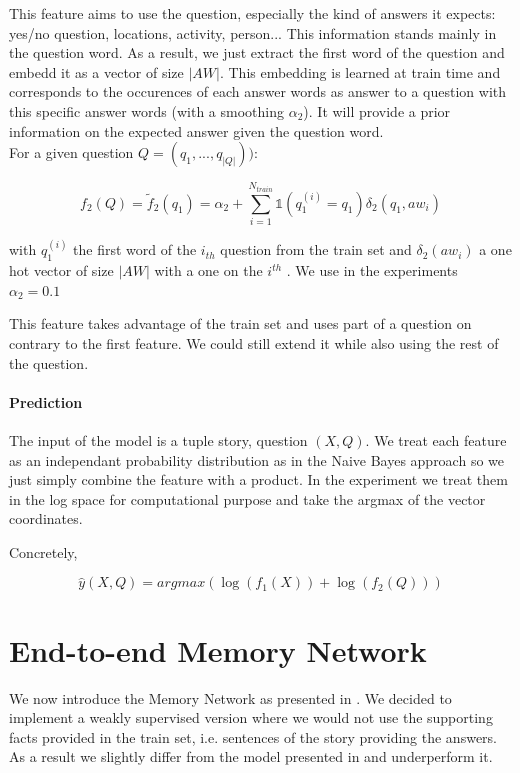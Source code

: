 \documentclass[twoside,11pt]{article}
\begin{document}
This feature aims to use the question, especially the kind of answers it expects: yes/no question, locations, activity, person... This information stands mainly in the question word. As a result, we just extract the first word of the question and embedd it as a vector of size $|AW|$. This embedding is learned at train time and corresponds to the occurences of each answer words as answer to a question with this specific answer words (with a smoothing $\alpha_2$). It will provide a prior information on the expected answer given the question word.\\

\noindent For a given question $Q = (q_1, ..., q_{|Q|}))$:

\[
f_2(Q) = \tilde{f}_2(q_1) = \alpha_2 + \sum_{i = 1}^{N_{train}} \mathbb{1}(q_1^{(i)}=q_1) \delta_2(q_1, aw_i)
\]

\noindent with $q_1^{(i)}$ the first word of the $i_{th}$ question from the train set and $\delta_2(aw_i)$ a one hot vector of size $|AW|$ with a one on the $i^{th}$ . We use in the experiments $\alpha_2 = 0.1$ 

\noindent This feature takes advantage of the train set and uses part of a question on contrary to the first feature. We could still extend it while also using the rest of the question. 

\paragraph{Prediction}

The input of the model is a tuple story, question $(X,Q)$. We treat each feature as an independant probability distribution as in the Naive Bayes approach so we just simply combine the feature with a product. In the experiment we treat them in the log space for computational purpose and take the argmax of the vector coordinates.

Concretely,

\[
\hat{y}(X,Q) = argmax(\log(f_1(X)) + \log(f_2(Q)))
\]

\section{End-to-end Memory Network}

We now introduce the Memory Network as presented in \cite{mem}. We decided to implement a weakly supervised version where we would not use the supporting facts provided in the train set, i.e. sentences of the story providing the answers. As a result we slightly differ from the model presented in \cite{memnn} and underperform it.
\end{document}
